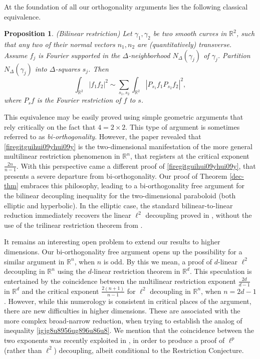\documentclass{amsart}%
\numberwithin{equation}{section}
\newtheorem{proposition}[theorem]{Proposition}
\newcommand{\R}{\mathbb{R}}
\newcommand{\1}{\mathbbm{1}}
\begin{document}
At the foundation of all our orthogonality arguments lies the following classical equivalence.
    \begin{proposition}(Bilinear restriction)
    \label{labell}
    Let $\gamma_1,\gamma_2$ be two smooth curves in $\R^2$, such that any two of their normal vectors $n_1,n_2$ are (quantitatively) transverse. Assume $f_j$ is Fourier supported in the $\Delta$-neighborhood $N_\Delta(\gamma_j)$ of $\gamma_j$. Partition $N_\Delta(\gamma_j)$ into $\Delta$-squares $s_j$. Then
    \begin{equation}
\label{firegitguihui09yhui09y}    
    \int_{\R^2}|f_1f_2|^2\sim \sum_{s_1,s_2}\int_{\R^2}|P_{s_1}f_1P_{s_2}f_2|^2,
    \end{equation}
    where $P_sf$ is the Fourier restriction of $f$ to $s$.\end{proposition}
    This equivalence may be easily proved using simple geometric arguments that rely critically on  the fact that $4=2\times 2$. This type of argument is sometimes referred to as {\em bi-orthogonality}. However, the paper \cite{BCT}
    revealed that \eqref{firegitguihui09yhui09y} is the two-dimensional manifestation of the more general multilinear restriction phenomenon in $\R^n$, that registers at the critical exponent $\frac{2n}{n-1}$. 
    With this perspective came a different proof of \eqref{firegitguihui09yhui09y},  that presents a severe departure from bi-orthogonality. 
    Our proof of Theorem \ref{dec-thm} embraces this philosophy, leading to a bi-orthogonality free argument for the bilinear decoupling inequality for the two-dimensional paraboloid (both elliptic and hyperbolic). 
    In the elliptic case, the standard bilinear-to-linear reduction immediately recovers the linear $\ell^2$ decoupling proved in \cite{Bourgain-Demeter-l2}, without the use of the trilinear restriction theorem from \cite{BCT}. 

    It remains an interesting open problem to extend our results to higher dimensions.  Our bi-orthogonality free argument opens up the possibility for a similar argument in $\R^n$, when $n$ is odd. By this we mean, a proof of $d$-linear $\ell^2$ decoupling in $\R^n$ using the $d$-linear restriction theorem in $\R^d$. 
    This  speculation is entertained by the coincidence between the multilinear restriction exponent $\frac{2d}{d-1}$ in $\R^d$ and the critical exponent $\frac{2(n+1)}{n-1}$ for $\ell^2$ decoupling in $\R^n$, when $n=2d-1$. However, while this numerology is consistent in critical places of the argument,  there are new difficulties in higher dimensions. These are associated with the more complex broad-narrow reduction, when trying to establish the analog of inequality
\eqref{igjg8u8956ug896u86u8}. We mention that the coincidence between the two exponents was recently exploited in \cite{ChOh}, in order to produce a proof of $\ell^p$ (rather than $\ell^2$) decoupling, albeit conditional to the Restriction Conjecture. 	
    
\end{document}
